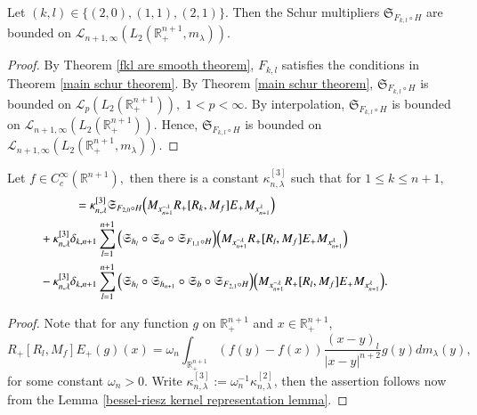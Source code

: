 \documentclass[12pt]{amsart}
\begin{document}
\begin{lemma}\label{fkl schur lemma} Let $(k,l)\in\{(2,0),(1,1),(2,1)\}.$ Then the Schur multipliers $\mathfrak{S}_{F_{k,l}\circ H}$ are bounded on $\mathcal{L}_{n+1,\infty}(L_2(\mathbb{R}^{n+1}_+,m_{\lambda})).$
\end{lemma}
\begin{proof} By Theorem \ref{fkl are smooth theorem}, $F_{k,l}$ satisfies the conditions in Theorem \ref{main schur theorem}. By Theorem \ref{main schur theorem}, $\mathfrak{S}_{F_{k,l}\circ H}$ is bounded on $\mathcal{L}_p(L_2(\mathbb{R}^{n+1}_+)),$ $1<p<\infty.$ By interpolation,  $\mathfrak{S}_{F_{k,l}\circ H}$ is bounded on $\mathcal{L}_{n+1,\infty}(L_2(\mathbb{R}^{n+1}_+)).$ Hence, $\mathfrak{S}_{F_{k,l}\circ H}$ is bounded on $\mathcal{L}_{n+1,\infty}(L_2(\mathbb{R}^{n+1}_+,m_{\lambda})).$
\end{proof}

\begin{lemma}\label{commutator representation lemma} Let $f\in C^{\infty}_c(\mathbb{R}^{n+1}),$ then there is a constant $\kappa_{n,\lambda}^{[3]}$ such that for $1\leq k\leq n+1,$
\begin{align*}
[R_{\lambda,k},M_{R_+f}]&=\kappa_{n,\lambda}^{[3]}\mathfrak{S}_{F_{2,0}\circ H}\Big( M_{x_{n+1}^{-\lambda}} R_+[R_k,M_{f}]E_+ M_{x_{n+1}^{\lambda}}\Big)\\
&\hspace{-1.0cm}+\kappa_{n,\lambda}^{[3]}\delta_{k,n+1}\sum_{l=1}^{n+1}\Big(\mathfrak{S}_{h_l}\circ\mathfrak{S}_a\circ\mathfrak{S}_{F_{1,1}\circ H}\Big)\Big(M_{x_{n+1}^{-\lambda}} R_+[R_l,M_{f}]E_+ M_{x_{n+1}^{\lambda}}\Big)\\
&\hspace{-1.0cm}-\kappa_{n,\lambda}^{[3]}\delta_{k,n+1}\sum_{l=1}^{n+1}\Big(\mathfrak{S}_{h_l}\circ\mathfrak{S}_{h_{n+1}}\circ\mathfrak{S}_b\circ\mathfrak{S}_{F_{2,1}\circ H}\Big)\Big( M_{x_{n+1}^{-\lambda}} R_+[R_l,M_{f}]E_+ M_{x_{n+1}^{\lambda}}\Big).
\end{align*}
\end{lemma}
\begin{proof} Note that for any function $g$ on $\mathbb{R}_+^{n+1}$ and $x\in\mathbb{R}_+^{n+1}$,
$$R_+[R_l,M_f]E_+(g)(x)=\omega_{n}\int_{\mathbb{R}_+^{n+1}}(f(y)-f(x))\frac{(x-y)_l}{|x-y|^{n+2}}g(y)dm_\lambda(y),$$
for some constant $\omega_{n}>0$. Write $\kappa_{n,\lambda}^{[3]}:=\omega_n^{-1}\kappa_{n,\lambda}^{[2]}$, then
the assertion follows now from the Lemma \ref{bessel-riesz kernel representation lemma}.
\end{proof}
\end{document}
